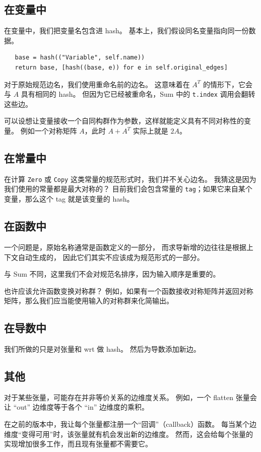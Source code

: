 \subsection{在变量中}
在变量中，我们把变量名包含进 hash。
基本上，我们假设同名变量指向同一份数据。
\begin{lstlisting}
   base = hash(("Variable", self.name))
   return base, [hash((base, e)) for e in self.original_edges]
\end{lstlisting}
对于原始规范边名，我们使用重命名前的边名。
这意味着在 $A^T$ 的情形下，它会与 $A$ 具有相同的 hash。
但因为它已经被重命名，Sum 中的 \texttt{t.index} 调用会翻转这些边。

可以设想让变量接收一个自同构群作为参数，这样就能定义具有不同对称性的变量。
例如一个对称矩阵 $A$，此时 $A+A^T$ 实际上就是 $2A$。

\subsection{在常量中}
在计算 \texttt{Zero} 或 \texttt{Copy} 这类常量的规范形式时，我们并不关心边名。
我猜这是因为我们使用的常量都是最大对称的？
目前我们会包含常量的 \texttt{tag}；如果它来自某个变量，那么这个 tag 就是该变量的 hash。

\subsection{在函数中}
一个问题是，原始名称通常是函数定义的一部分，
而求导新增的边往往是根据上下文自动生成的，
因此它们其实不应该成为规范形式的一部分。

与 Sum 不同，这里我们不会对规范名排序，因为输入顺序是重要的。

也许应该允许函数变换对称群？
例如，如果有一个函数接收对称矩阵并返回对称矩阵，那么我们应当能使用输入的对称群来化简输出。

\subsection{在导数中}
我们所做的只是对张量和 wrt 做 hash。
然后为导数添加新边。

\subsection{其他}
对于某些张量，可能存在并非等价关系的边维度关系。
例如，一个 flatten 张量会让 “out” 边维度等于各个 “in” 边维度的乘积。

在之前的版本中，我让每个张量都注册一个“回调”（callback）函数。
每当某个边维度“变得可用”时，该张量就有机会发出新的边维度。
然而，这会给每个张量的实现增加很多工作，而且现有张量都不需要它。

